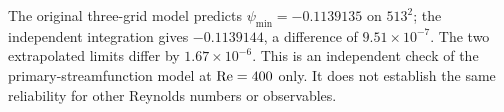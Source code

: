 The original three-grid model predicts $\psi_{\min}=-0.1139135$ on $513^2$; the independent integration gives $-0.1139144$, a difference of $9.51\times10^{-7}$. The two extrapolated limits differ by $1.67\times10^{-6}$. This is an independent check of the primary-streamfunction model at $\mathrm{Re}=400$ only. It does not establish the same reliability for other Reynolds numbers or observables.
